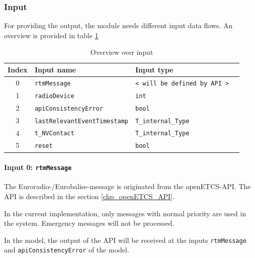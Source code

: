 \documentclass{template/openetcs_report}
\begin{document}
\subsubsection{Input}

For providing the output, the module needs different input data flows. An overview is provided in table \ref{tbl:ReceiveMessageAndCheckConsistencyInput}

\begin{table}[H]
  \begin{tabular}{| c | l | l | l |}
    \hline
    \textbf{Index} & \textbf{Input name} & \textbf{Input type}\\ \hline
    0 & \texttt{rtmMessage} & \texttt{< will be defined by API >} \\
    1 & \texttt{radioDevice} & \texttt{int}\\
    2 & \texttt{apiConsistencyError} & \texttt{bool}\\
    3 & \texttt{lastRelevantEventTimestamp} & \texttt{T\_internal\_Type}\\
    4 & \texttt{t\_NVContact} & \texttt{T\_internal\_Type}\\
    5 & \texttt{reset} & \texttt{bool} \\
    \hline
  \end{tabular} 
  \caption{Overview over input}
  \label{tbl:ReceiveMessageAndCheckConsistencyInput}
\end{table}

\paragraph{Input 0: \texttt{rtmMessage}}

The Euroradio-/Eurobalise-message is originated from the openETCS-API. The API is described in the section \ref{chp_openETCS_API}.

In the current implementation, only messages with normal priority are used in the system. Emergency messages will not be processed.

In the model, the output of the API will be received at the inputs \texttt{rtmMessage} and \texttt{apiConsistencyError} of the model.

\end{document}

